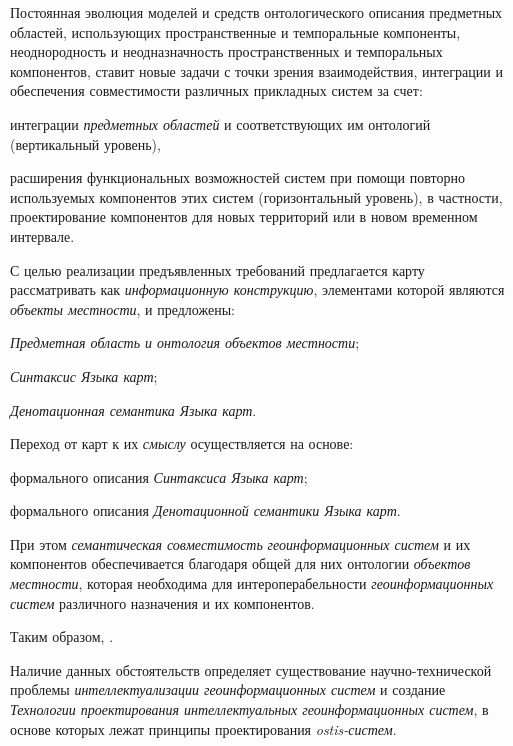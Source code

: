 Постоянная эволюция моделей и средств онтологического описания предметных областей, использующих пространственные и темпоральные компоненты, неоднородность и неодназначность пространственных и темпоральных компонентов, ставит новые задачи с точки зрения взаимодействия, интеграции и обеспечения совместимости различных прикладных систем за счет:
\begin{textitemize}
	\item интеграции \textit{предметных областей} и соответствующих им онтологий (вертикальный уровень), 
	\item расширения функциональных возможностей систем при помощи повторно используемых компонентов этих систем (горизонтальный уровень), в частности, проектирование компонентов для новых территорий или в новом временном интервале.
\end{textitemize}

С целью реализации предъявленных требований предлагается карту рассматривать как \textit{информационную конструкцию}, элементами которой являются \textit{объекты местности}, и предложены:
\begin{textitemize}
	\item \textit{Предметная область и онтология объектов местности};
	\item \textit{Синтаксис Языка карт}; 
	\item \textit{Денотационная семантика Языка карт}.
\end{textitemize}

Переход от карт к их \textit{смыслу} осуществляется на основе:
\begin{textitemize}
	\item формального описания \textit{Синтаксиса Языка карт};
	\item формального описания \textit{Денотационной семантики Языка карт}.
\end{textitemize}

При этом \textit{семантическая совместимость} \textit{геоинформационных систем} и их компонентов обеспечивается благодаря общей для них онтологии \textit{объектов местности}, которая необходима для интероперабельности \textit{геоинформационных систем} различного назначения и их компонентов.

Таким образом,  .

Наличие данных обстоятельств определяет существование научно-технической проблемы \textit{интеллектуализации геоинформационных систем} и создание \textit{Технологии проектирования интеллектуальных геоинформационных систем}, в основе которых лежат принципы проектирования \textit{ostis-систем}.

